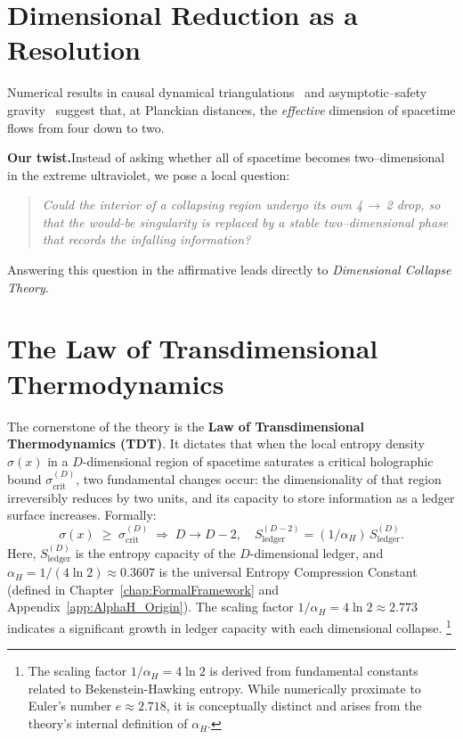 \documentclass[a4paper, 12pt, oneside]{book}
\numberwithin{equation}{chapter}
\begin{document}
\section{Dimensional Reduction as a Resolution}

Numerical results in causal dynamical triangulations~\cite{Ambjorn2005,Ambjorn2012}
and asymptotic–safety gravity~\cite{Lauscher2005} suggest that, at
Planckian distances, the \emph{effective} dimension of spacetime flows
from four down to two.

\vspace{0.5em}
\noindent
\textbf{Our twist.}\;Instead of asking whether all of spacetime becomes
two–dimensional in the extreme ultraviolet, we pose a local question:

\begin{quote}
\emph{Could the interior of a collapsing region undergo its own
4\,$\to$\,2 drop, so that the would-be singularity is replaced by a
stable two–dimensional phase that records the infalling information?}
\end{quote}

Answering this question in the affirmative leads directly to
\emph{Dimensional Collapse Theory}.

\section[The Law of Transdimensional Thermodynamics]{The Law of Transdimensional Thermodynamics}
\label{sec:IntroTDT} %

The cornerstone of the theory is the \textbf{Law of Transdimensional Thermodynamics (TDT)}. It dictates that when the local entropy density $\sigma(x)$ in a $D$-dimensional region of spacetime saturates a critical holographic bound $\sigma_{\mathrm{crit}}^{(D)}$, two fundamental changes occur: the dimensionality of that region irreversibly reduces by two units, and its capacity to store information as a ledger surface increases. Formally:
\[
  \sigma(x) \;\ge\; \sigma_{\mathrm{crit}}^{(D)}
  \;\Longrightarrow\;
  D \to D-2,
  \quad
  S_{\mathrm{ledger}}^{(D-2)} = (1/\alpha_H)\,S_{\mathrm{ledger}}^{(D)}.
  \label{eq:IntroTDTeqn}
\]
Here, $S_{\mathrm{ledger}}^{(D)}$ is the entropy capacity of the $D$-dimensional ledger, and $\alpha_H = 1/(4\ln 2) \approx 0.3607$ is the universal Entropy Compression Constant (defined in Chapter~\ref{chap:FormalFramework} and Appendix~\ref{app:AlphaH_Origin}). The scaling factor $1/\alpha_H = 4\ln 2 \approx 2.773$ indicates a significant growth in ledger capacity with each dimensional collapse. \footnote{The scaling factor $1/\alpha_H = 4\ln 2$ is derived from fundamental constants related to Bekenstein-Hawking entropy. While numerically proximate to Euler's number $e \approx 2.718$, it is conceptually distinct and arises from the theory's internal definition of $\alpha_H$.}
\end{document}
